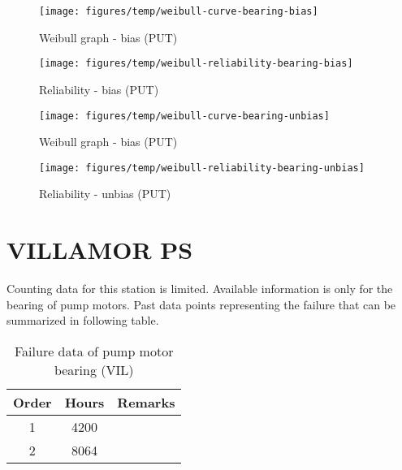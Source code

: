 \documentclass[fleqn]{article}
\begin{document}
\begin{figure}[!htb]
	\begin{minipage}[b]{0.5\linewidth}
		\centering
		\texttt{[image: figures/temp/weibull-curve-bearing-bias]}
		\caption{Weibull graph - bias (PUT)}
		\label{weibull-graph-vil-bearing-bias}
	\end{minipage}
	\hspace{0.05cm}
	\begin{minipage}[b]{0.5\linewidth}
		\centering
		\texttt{[image: figures/temp/weibull-reliability-bearing-bias]}
		\caption{Reliability - bias (PUT)}
		\label{weibull-graph-vil-reliability-bias}
	\end{minipage}
\end{figure}



\begin{figure}[!htb]
	\begin{minipage}[b]{0.5\linewidth}
		\centering
		\texttt{[image: figures/temp/weibull-curve-bearing-unbias]}
		\caption{Weibull graph - bias (PUT)}
		\label{weibull-graph-vil-bearing-unbias}
	\end{minipage}
	\hspace{0.05cm}
	\begin{minipage}[b]{0.5\linewidth}
		\centering
		\texttt{[image: figures/temp/weibull-reliability-bearing-unbias]}
		\caption{Reliability - unbias (PUT)}
		\label{weibull-graph-vil-reliability-unbias}
	\end{minipage}
\end{figure}




\section{VILLAMOR PS}

Counting data for this station is limited. Available information is only for the bearing of pump motors. Past data points representing the failure that can be summarized in following table.


\begin{table}[!htb]
	\centering
	\caption{Failure data of pump motor bearing (VIL)}
	\label{table_bearing_failure_bias}
	{\scriptsize
		\begin{tabular}{c|c|c}
			\hline
			Order & Hours & Remarks \\ 
			\hline
			1 & 4200 &  \\ 
			2 & 8064 &  \\ 
				\hline
		\end{tabular}
		
	}%
\end{table}
\end{document}

